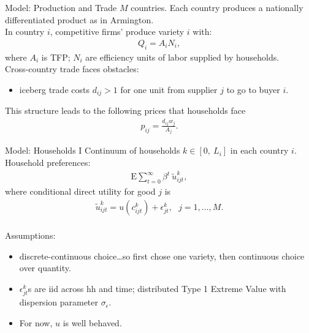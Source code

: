 \documentclass[9pt,pdftex,aspectratio=1610]{beamer}
\theoremstyle{definition}
\begin{document}
\begin{frame}[t]{Model: Production and Trade}
\smallskip
$M$ countries. Each country produces a nationally differentiated product as in Armington.\\
\bigskip
\medskip
In country $i$, competitive firms' produce variety $i$ with:
\begin{align*}
Q_i = A_i N_i,
\end{align*}
where $A_i$ is TFP; $N_i$ are efficiency units of labor supplied by households.\\
\bigskip
\medskip
Cross-country trade faces obstacles:
\begin{itemize}
\smallskip
\item iceberg trade costs $d_{ij} > 1$ for one unit from supplier $j$ to go to buyer $i$.
\end{itemize}
\bigskip
\medskip
This structure leads to the following prices that households face
\begin{align*}
p_{ij} = \frac{d_{ij}w_{j}}{A_{j}}.
\end{align*}
\end{frame}


\begin{frame}[t]{Model: Households I}
\smallskip
Continuum of households $k \in [0, \ L_i]$ in each country $i$. Household preferences:
\begin{align*}
\mathrm{E}\sum_{t = 0}^{\infty} \beta^{t} \ \tilde{u}^k_{ijt},
\end{align*}
where conditional direct utility for good $j$ is
\begin{align*}
\tilde{u}^k_{ijt} =  u(c^k_{ijt}) + \epsilon^k_{jt}, \ \ \ j = 1, \ldots, M.
\end{align*}\\
\medskip
Assumptions:
\begin{itemize}
\item discrete-continuous choice\ldots so first chose one variety, then continuous choice over quantity.
\smallskip
\item $\epsilon^k_{jt}$s are iid across hh and time; distributed Type 1 Extreme Value with dispersion parameter $\sigma_{\epsilon}$.
\smallskip
\item For now, $u$ is well behaved.
\end{itemize}
\end{frame}
\end{document}
